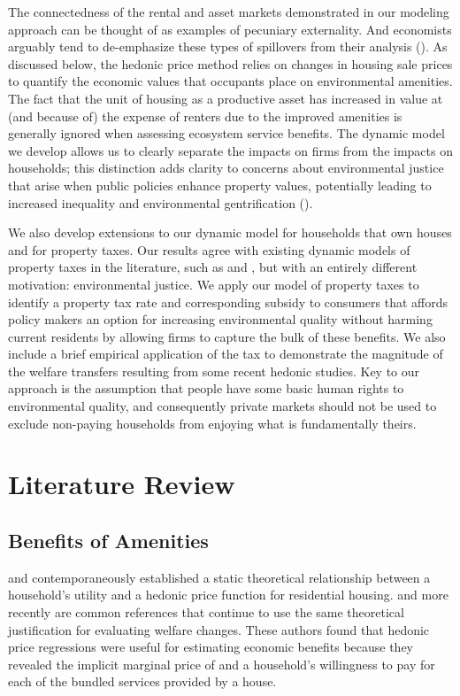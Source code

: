 \documentclass[ecta,nameyear,draft]{econsocart}
\theoremstyle{plain}
\theoremstyle{remark}
\begin{document}
The connectedness of the rental and asset markets demonstrated in our modeling approach can be thought of as examples of pecuniary externality. And economists arguably tend to de-emphasize these types of spillovers from their analysis (\cite{holcombe01}). As discussed below, the hedonic price method relies on changes in housing sale prices to quantify the economic values that occupants place on environmental amenities. The fact that the unit of housing as a productive asset has increased in value at (and because of) the expense of renters due to the improved amenities is generally ignored when assessing ecosystem service benefits. The dynamic model we develop allows us to clearly separate the impacts on firms from the impacts on households; this distinction adds clarity to concerns about environmental justice that arise when public policies enhance property values, potentially leading to increased inequality and environmental gentrification (\cite{banzhaf20}). 

We also develop extensions to our dynamic model for households that own houses and for property taxes. Our results agree with existing dynamic models of property taxes in the literature, such as \cite{freeman80} and \cite{poterba84}, but with an entirely different motivation: environmental justice. We apply our model of property taxes to identify a  property tax rate and corresponding subsidy to consumers that affords policy makers an option for increasing environmental quality without harming current residents by allowing firms to capture the bulk of these benefits. We also include a brief empirical application of the tax to demonstrate the magnitude of the welfare transfers resulting from some recent hedonic studies. Key to our approach is the assumption that people have some basic human rights to environmental quality, and consequently private markets should not be used to exclude non-paying households from enjoying what is fundamentally theirs.


\section{Literature Review}

\subsection{Benefits of Amenities}

\cite{rosen74} and \cite{freeman74} contemporaneously established a static theoretical relationship between a household's utility and a hedonic price function for residential housing. \cite{freeman99} and more recently \cite{freeman14} are common references that continue to use the same theoretical justification for evaluating welfare changes. These authors found that hedonic price regressions were useful for estimating economic benefits because they revealed the implicit marginal price of and a household's willingness to pay for each of the bundled services provided by a house. 
\end{document}
